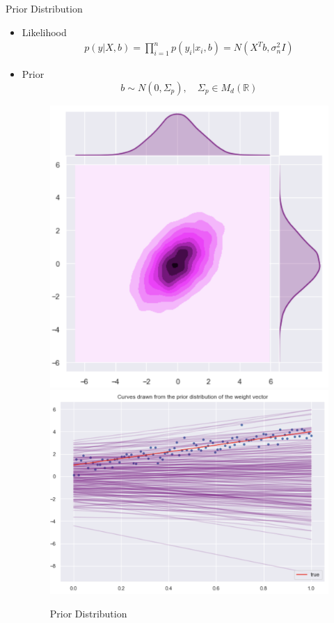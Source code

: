 \documentclass[10pt]{beamer}
\begin{document}
\begin{frame}{Prior Distribution}
\begin{itemize}
\item Likelihood
\begin{align*}
p(y|X, b) 
= \prod_{i=1}^{n}p(y_i|x_i, b) 
= N(X^T b, \sigma_n^2 I)
\end{align*}

\item Prior 
$$
b \sim N(0, \Sigma_p), \quad  \Sigma_p \in M_{d}(\mathbb{R})
$$

\begin{center}
\begin{figure}
\includegraphics[scale=0.17]{images/lin_join_prior.png} 
\includegraphics[scale=0.17]{images/prior_lin_mod_param_distr.png} 
\caption{Prior Distribution}
\end{figure}
\end{center}
\end{itemize}
\end{frame}
\end{document}
